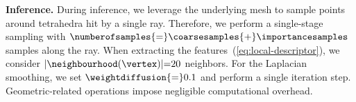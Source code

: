     \noindent\textbf{Inference.}
    During inference, we leverage the underlying mesh to sample points around
    tetrahedra hit by a single ray.
    Therefore, we perform a single-stage sampling with
    $\numberofsamples{=}\coarsesamples{+}\importancesamples$ samples along the
    ray.
    When extracting the features~(\cref{eq:local-descriptor}), we consider
    $|\neighbourhood(\vertex)|{=}20$ neighbors.
    For the Laplacian smoothing, we set $\weightdiffusion{=}0.1$ and perform a
    single iteration step.
    Geometric-related operations impose negligible computational overhead.
